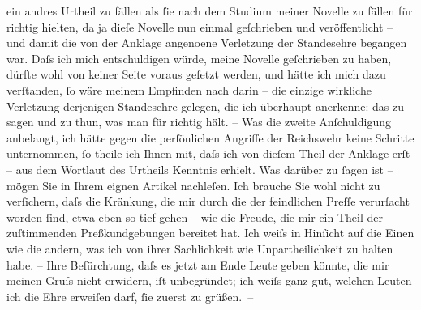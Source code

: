                ein andres Urtheil zu fällen als{ }ſie nach dem Studium meiner Novelle zu fällen für richtig hielten, da
               ja dieſe Novelle nun einmal
               geſchrieben und veröffent{\pb}licht  – und damit die
               von der Anklage angeno{\geminationm}ene Verletzung der Standesehre begangen war. Daſs ich mich
                entschuldigen würde, meine Novelle geſchrieben zu haben, dürfte wohl
               von keiner Seite voraus geſetzt werden, und hätte ich mich dazu verſtanden,{ }ſo wäre
               meinem Empfinden nach darin – die einzige wirkliche Verletzung der\introOben{}jenigen\introOben{} Standesehre
               gelegen, die ich überhaupt anerkenne: das zu sagen \introOben{}und zu thun\introOben{}, was man {\pb}für richtig
               hält. – Was die zweite Anſchuldigung anbelangt, ich hätte gegen die perſönlichen
               Angriffe der Reichswehr keine Schritte
               unternommen,{ }ſo theile ich Ihnen mit, daſs ich von dieſem Theil der Anklage erſt –
               aus dem Wortlaut des Urtheils Kenntnis erhielt. Was darüber zu{ }ſagen ist – mögen Sie
               in Ihrem eignen Artikel
               nachleſen. Ich brauche Sie wohl nicht zu verſichern, daſs die Kränkung, die mir durch
               die \label{K_L04235-2v}\label{K_L04235-2} der feindlichen
               Preſſe verurſacht worden{ }ſind, etwa eben so tief gehen – wie die Freude,
               die mir ein Theil der zuſtimmenden Preßkundgebungen bereitet hat. Ich
               weiſs in Hinſicht auf die Einen wie die andern, was ich von ihrer Sachlichkeit wie
               Unpartheilichkeit zu halten habe. – Ihre Befürchtung, daſs es jetzt am Ende Leute
               geben könnte, die mir meinen Gruſs nicht erwidern, {\pb}iſt unbegründet; ich weiſs ganz
               gut, welchen Leuten ich die Ehre erweiſen darf,{ }ſie zuerst zu grüßen. –\pend
           
